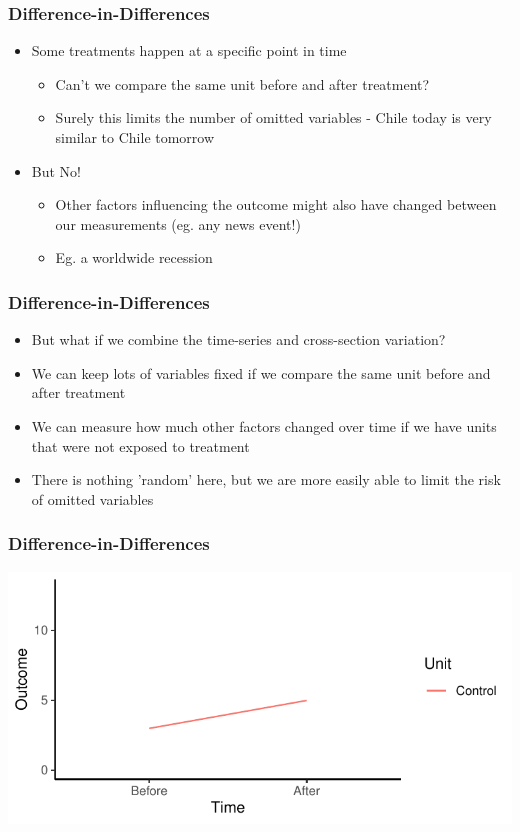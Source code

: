 \documentclass[xcolor=x11names,compress]{beamer}\usepackage[]{graphicx}\usepackage[]{color}
\makeatletter
\def\maxwidth{ %
  \ifdim\Gin@nat@width>\linewidth
    \linewidth
  \else
    \Gin@nat@width
  \fi
}
\newenvironment{knitrout}{}{} %
\renewcommand{\(}{\begin{columns}}
\renewcommand{\)}{\end{columns}}
\newcommand{\<}[1]{\begin{column}{#1}}
\renewcommand{\>}{\end{column}}
\makeatother
\begin{document}
\begin{frame}
\frametitle{Difference-in-Differences}
\begin{itemize}
\item Some treatments happen at a specific point in time
\begin{itemize}
\item Can't we compare the same unit before and after treatment?
\pause
\item Surely this limits the number of omitted variables - Chile today is very similar to Chile tomorrow
\end{itemize}
\item But No!
\begin{itemize}
\item Other factors influencing the outcome might also have changed between our measurements (eg. any news event!)
\item Eg. a worldwide recession
\end{itemize}
\end{itemize}
\end{frame}

\begin{frame}
\frametitle{Difference-in-Differences}
\begin{itemize}
\item But what if we combine the time-series and cross-section variation?
\pause
\item We can keep lots of variables fixed if we compare the same unit before and after treatment
\pause
\item We can measure how much other factors changed over time if we have units that were not exposed to treatment
\pause
\item There is nothing 'random' here, but we are more easily able to limit the risk of omitted variables
\end{itemize}
\end{frame}

\begin{frame}
\frametitle{Difference-in-Differences}
\begin{knitrout}
\color{fgcolor}
\includegraphics[width=\maxwidth]{figure/DinD_chart1-1} 

\end{knitrout}
\end{frame}
\end{document}

